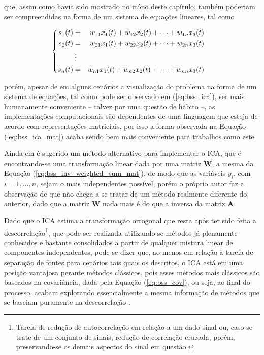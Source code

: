 \noindent que, assim como havia sido mostrado no início deste capítulo, também poderiam ser compreendidas na forma de um sistema de equações lineares, tal como

\begin{equation}
\begin{cases}
\begin{aligned}
    s_{1}(t) & = & w_{11} x_{1}(t) +  w_{12} x_{2}(t) + \cdots + w_{1n} x_{3}(t) \\
    s_{2}(t) & = & w_{21} x_{1}(t) +  w_{22} x_{2}(t) + \cdots + w_{2n} x_{3}(t) \\
     & \hspace{0.08cm} \vdots & \\
    s_{n}(t) & = & w_{n1} x_{1}(t) +  w_{n2} x_{2}(t) + \cdots + w_{nn} x_{3}(t)
    \label{eq:bss_ica}
\end{aligned}
\end{cases}
\vspace{0.2cm}
\end{equation}

\noindent porém, apesar de em alguns cenários a visualização do problema na forma de um sistema de equações, tal como pode ser observado em (\ref{eq:bss_ica}), ser mais humanamente conveniente -- talvez por uma questão de hábito --, as implementações computacionais são dependentes de uma linguagem que esteja de acordo com representações matriciais, por isso a forma observada na Equação (\ref{eq:bss_ica_mat}) acaba sendo bem mais conveniente para trabalhos como este.

Ainda em \citep{hyvarinen2004independent} é sugerido um método alternativo para implementar o ICA, que é encontrando-se uma transformação linear dada por uma matriz $\mathbf{W}$, a mesma da Equação (\ref{eq:bss_inv_weighted_sum_mat}), de modo que as variáveis $y_{i}$, com $i=1,\dotsc,n$, sejam o mais independentes possível, porém o próprio autor faz a observação de que não chega a se tratar de um método realmente diferente do anterior, dado que a matriz $\mathbf{W}$ nada mais é do que a inversa da matriz $\mathbf{A}$.

Dado que o ICA estima a transformação ortogonal que resta após ter sido feita a descorrelação\footnote{Tarefa de redução de autocorrelação em relação a um dado sinal ou, caso se trate de um conjunto de sinais, redução de correlação cruzada, porém, preservando-se os demais aspectos do sinal em questão.}, que pode ser realizada utilizando-se métodos já plenamente conhecidos e bastante consolidados a partir de qualquer mistura linear de componentes independentes, pode-se dizer que, ao menos em relação à tarefa de separação de fontes para cenários tais quais os descritos, o ICA está em uma posição vantajosa perante métodos clássicos, pois esses métodos mais clássicos são baseados na covariância, dada pela Equação (\ref{eq:bss_cov}), ou seja, ao final do processo, acabam explorando essencialmente a mesma informação de métodos que se baseiam puramente na descorrelação \citep{hyvarinen2004independent}.\\

